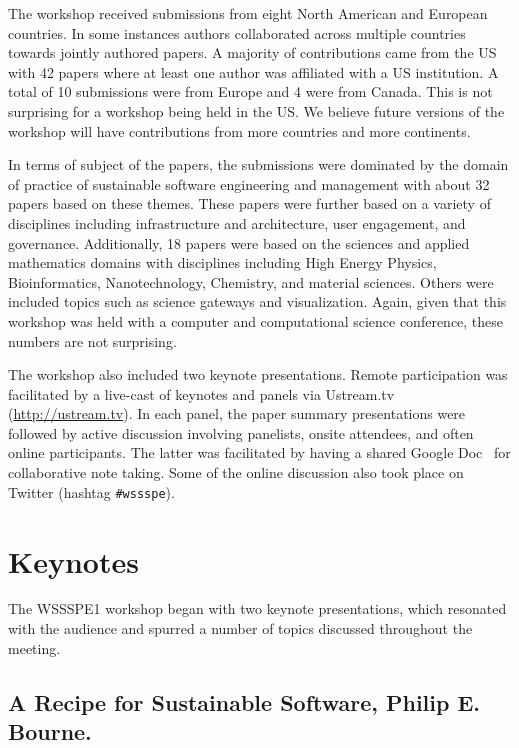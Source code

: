 \documentclass[11pt, oneside]{amsart}
\newcommand{\note}[1]{ {\textcolor{red}    { #1 }}}
\begin{document}
The workshop received submissions from eight North
American and European countries. In some instances authors collaborated across
multiple countries towards jointly authored papers. A majority of
contributions came from the US with 42 papers where at least one author was
affiliated with a US institution. A total of 10 submissions were from 
Europe and 4 were from Canada.  This is not surprising for a workshop
being held in the US.  We believe future versions of the workshop will
have contributions from more countries and more continents.

In terms of subject of the papers, the submissions were dominated by the domain
of practice of sustainable software engineering and management with about 32
papers based on these themes. These papers were further based on a variety of
disciplines including infrastructure and architecture, user engagement, and
governance. Additionally, 18 papers were based on the sciences and
applied mathematics domains with disciplines including High Energy Physics,
Bioinformatics, Nanotechnology, Chemistry, and material sciences. Others were
included topics such as science gateways and visualization.  Again, given that
this workshop was held with a computer and computational science conference,
these numbers are not surprising.

The workshop also included two keynote presentations.
Remote participation was facilitated by a
live-cast of keynotes and panels via Ustream.tv
(\url{http://ustream.tv}).
In each panel, the paper summary presentations were followed by active discussion
involving panelists, onsite attendees, and often online
participants. The latter was facilitated by having a shared Google
Doc~\cite{WSSSPE1-google-notes} for collaborative note taking. Some of
the online discussion also took place on Twitter (hashtag
\texttt{\#wssspe}).



\section{Keynotes } \label{sec:keynotes} %

The WSSSPE1 workshop began with two keynote presentations, which 
resonated with the audience and spurred a number of topics  
discussed throughout the meeting.

\subsection{A Recipe for Sustainable Software, Philip E. Bourne.} \label{sec:keynote1}
\end{document}

